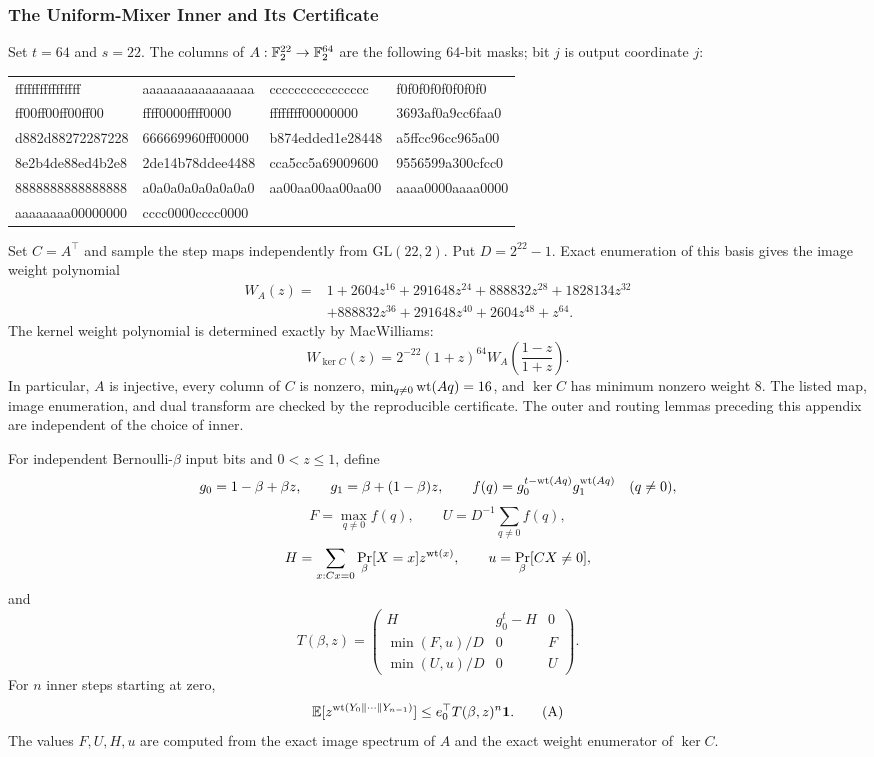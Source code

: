 \subsubsection{The Uniform-Mixer Inner and Its Certificate}
\label{app:shared-inner-proof}
\label{app:shared-inner-map}

Set $t=64$ and $s=22$. The columns of $A:\mathbb F_2^{22}\to\mathbb F_2^{64}$
are the following $64$-bit masks; bit $j$ is output coordinate $j$:
\begin{center}\footnotesize\ttfamily
\begin{tabular}{@{}llll@{}}
ffffffffffffffff & aaaaaaaaaaaaaaaa & cccccccccccccccc & f0f0f0f0f0f0f0f0\\
ff00ff00ff00ff00 & ffff0000ffff0000 & ffffffff00000000 & 3693af0a9cc6faa0\\
d882d88272287228 & 666669960ff00000 & b874edded1e28448 & a5ffcc96cc965a00\\
8e2b4de88ed4b2e8 & 2de14b78ddee4488 & cca5cc5a69009600 & 9556599a300cfcc0\\
8888888888888888 & a0a0a0a0a0a0a0a0 & aa00aa00aa00aa00 & aaaa0000aaaa0000\\
aaaaaaaa00000000 & cccc0000cccc0000 & &
\end{tabular}
\end{center}
Set $C=A^\top$ and sample the step maps independently from
$\mathrm{GL}(22,2)$. Put $D=2^{22}-1$. Exact enumeration of this
basis gives the image weight polynomial
\[
\begin{aligned}
 W_A(z)={}&1+2604z^{16}+291648z^{24}+888832z^{28}
 +1828134z^{32}\\
 &+888832z^{36}+291648z^{40}+2604z^{48}+z^{64}.
\end{aligned}
\]
The kernel weight polynomial is determined exactly by MacWilliams:
\[
 W_{\ker C}(z)=2^{-22}(1+z)^{64}
 W_A\!\left(\frac{1-z}{1+z}\right).
\]
In particular, $A$ is injective, every column of $C$ is nonzero,
$\min_{q\ne0}\operatorname{wt}(Aq)=16$, and $\ker C$ has minimum nonzero weight $8$.
The listed map, image enumeration, and dual transform are checked by
the reproducible certificate\repositorycite. The outer and routing
lemmas preceding this appendix are independent of the choice of inner.

\begin{lemma}
\label{lem:shared-inner-weighted-envelope}
For independent Bernoulli-$\beta$ input bits and $0<z\le1$, define
\[
 g_0=1-\beta+\beta z,\qquad g_1=\beta+(1-\beta)z,\qquad
 f(q)=g_0^{t-\operatorname{wt}(Aq)}g_1^{\operatorname{wt}(Aq)}\quad(q\ne0),
\]
\[
 F=\max_{q\ne0}f(q),\qquad U=D^{-1}\sum_{q\ne0}f(q),
\]
\[
 H=\sum_{x:Cx=0}\Pr_\beta[X=x]z^{\operatorname{wt}(x)},\qquad
 u=\Pr_\beta[CX\ne0],
\]
and
\[
 T(\beta,z)=
 \begin{pmatrix}
 H&g_0^t-H&0\\
 \min(F,u)/D&0&F\\
 \min(U,u)/D&0&U
 \end{pmatrix}.
\]
For $n$ inner steps starting at zero,
\[
 \mathbb E[z^{\operatorname{wt}(Y_0\Vert\cdots\Vert Y_{n-1})}]
 \le e_0^\top T(\beta,z)^n\mathbf1.
 \tag{A}
\]
The values $F,U,H,u$ are computed from the exact image spectrum of
$A$ and the exact weight enumerator of $\ker C$.
\end{lemma}


